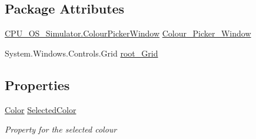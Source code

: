 \subsection*{Package Attributes}
\begin{DoxyCompactItemize}
\item 
\hyperlink{class_c_p_u___o_s___simulator_1_1_colour_picker_window}{C\+P\+U\+\_\+\+O\+S\+\_\+\+Simulator.\+Colour\+Picker\+Window} \hyperlink{class_c_p_u___o_s___simulator_1_1_colour_picker_window_ae1fb4e0b93aecac6fdff7fe54382e033}{Colour\+\_\+\+Picker\+\_\+\+Window}
\item 
System.\+Windows.\+Controls.\+Grid \hyperlink{class_c_p_u___o_s___simulator_1_1_colour_picker_window_ad3f58999085d75f00e86e4796aa87ed3}{root\+\_\+\+Grid}
\end{DoxyCompactItemize}
\subsection*{Properties}
\begin{DoxyCompactItemize}
\item 
\hyperlink{_console_window_8xaml_8cs_adf2800823d988ace598d734fdec29975}{Color} \hyperlink{class_c_p_u___o_s___simulator_1_1_colour_picker_window_a4e51070f2e58d178bf773acb4200e76e}{Selected\+Color}
\begin{DoxyCompactList}\small\item\em Property for the selected colour \end{DoxyCompactList}\end{DoxyCompactItemize}
